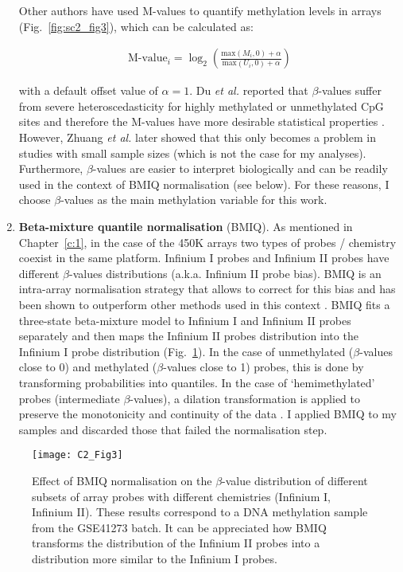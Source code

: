 \begin{enumerate}
	Other authors have used M-values to quantify methylation levels in arrays (Fig.~\ref{fig:sc2_fig3}), which can be calculated as:
	
	\begin{align}
	\text{M-value}_i = \log_2 \left(\frac{\text{max}(M_i,0) + \alpha}{\text{max}(U_i,0) + \alpha}\right)
	\end{align}
	
	with a default offset value of $\alpha=1$.  Du \textit{et al.} reported that $\beta$-values suffer from severe heteroscedasticity for highly methylated or unmethylated CpG sites and therefore the M-values have more desirable statistical properties \cite{Du2010}. However, Zhuang \textit{et al.} later showed that this only becomes a problem in studies with small sample sizes \cite{Zhuang2012} (which is not the case for my analyses). Furthermore, $\beta$-values are easier to interpret biologically and can be readily used in the context of BMIQ normalisation (see below). For these reasons, I choose $\beta$-values as the main methylation variable for this work.
	
	\item \textbf{Beta-mixture quantile normalisation} (\acrshort{BMIQ}). As mentioned in Chapter~\ref{c:1}, in the case of the 450K arrays two types of probes / chemistry coexist in the same platform. Infinium I probes and Infinium II probes have different $\beta$-values distributions (a.k.a. Infinium II probe bias). BMIQ is an intra-array normalisation strategy that allows to correct for this bias and has been shown to outperform other methods used in this context \cite{Teschendorff2012,Dedeurwaerder2011,Touleimat2012,Maksimovic2012}. BMIQ fits a three-state beta-mixture model to Infinium I and Infinium II probes separately and then maps the Infinium II probes distribution into the Infinium I probe distribution (Fig.~\ref{fig:c2_fig3}). In the case of unmethylated ($\beta$-values close to 0) and methylated ($\beta$-values close to 1) probes, this is done by transforming probabilities into quantiles. In the case of `hemimethylated' probes (intermediate $\beta$-values), a dilation transformation is applied to preserve the monotonicity and continuity of the data \cite{Teschendorff2012}. I applied BMIQ to my samples and discarded those that failed the normalisation step.  
	
\end{enumerate}

\bigskip
 
\begin{figure}[htbp!] 
	\centering    
	\texttt{[image: C2\_Fig3]}
	\caption[Effect of BMIQ normalisation on the $\beta$-value distribution]{Effect of BMIQ normalisation on the $\beta$-value distribution of different subsets of array probes with different chemistries (Infinium I, Infinium II). These results correspond to a DNA methylation sample from the GSE41273 batch. It can be appreciated how BMIQ transforms the distribution of the Infinium II probes into a distribution more similar to the Infinium I probes.}
	\label{fig:c2_fig3}
\end{figure}

